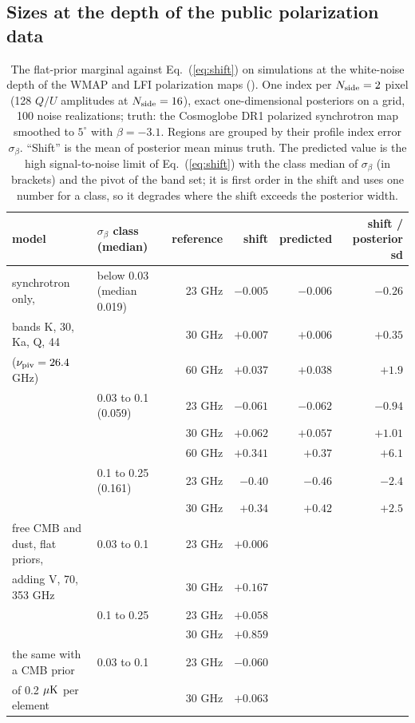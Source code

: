 \subsection{Sizes at the depth of the public polarization data}

\begin{table}
\centering
\caption{The flat-prior marginal against Eq.~(\ref{eq:shift}) on simulations at the white-noise depth
of the WMAP and LFI polarization maps (). One index per $N_{\rm side}=2$ pixel (128 $Q/U$
amplitudes at $N_{\rm side}=16$), exact one-dimensional posteriors on a grid, 100 noise realizations;
truth: the Cosmoglobe DR1 polarized synchrotron map smoothed to $5^\circ$ with $\beta = -3.1$. Regions
are grouped by their profile index error $\sigma_\beta$. ``Shift'' is the mean of posterior mean minus
truth. The predicted value is the high signal-to-noise limit of Eq.~(\ref{eq:shift}) with the class median of
$\sigma_\beta$ (in brackets) and the pivot of the band set; it is first order in the shift and uses one number for a class, so it
degrades where the shift exceeds the posterior width.}
\label{tab:flat}
\small
\begin{tabular}{llrrrr}
\toprule
model & $\sigma_\beta$ class (median) & reference & shift & predicted & shift / posterior sd \\
\midrule
synchrotron only, & below 0.03 (median 0.019) & 23 GHz & $-0.005$ & $-0.006$ & $-0.26$ \\
bands K, 30, Ka, Q, 44 &             & 30 GHz & $+0.007$ & $+0.006$ & $+0.35$ \\
($\nu_{\mathrm{piv}} = 26.4$ GHz)   &             & 60 GHz & $+0.037$ & $+0.038$ & $+1.9$ \\
                        & 0.03 to 0.1 (0.059) & 23 GHz & $-0.061$ & $-0.062$ & $-0.94$ \\
                        &             & 30 GHz & $+0.062$ & $+0.057$ & $+1.01$ \\
                        &             & 60 GHz & $+0.341$ & $+0.37$ & $+6.1$ \\
                        & 0.1 to 0.25 (0.161) & 23 GHz & $-0.40$ & $-0.46$ & $-2.4$ \\
                        &             & 30 GHz & $+0.34$ & $+0.42$ & $+2.5$ \\
\midrule
free CMB and dust, flat priors, & 0.03 to 0.1 & 23 GHz & $+0.006$ & & \\
adding V, 70, 353 GHz           &             & 30 GHz & $+0.167$ & & \\
                                & 0.1 to 0.25 & 23 GHz & $+0.058$ & & \\
                                &             & 30 GHz & $+0.859$ & & \\
\midrule
the same with a CMB prior & 0.03 to 0.1 & 23 GHz & $-0.060$ & & \\
of 0.2 $\mu\mathrm{K}$ per element &             & 30 GHz & $+0.063$ & & \\
\bottomrule
\end{tabular}
\end{table}


